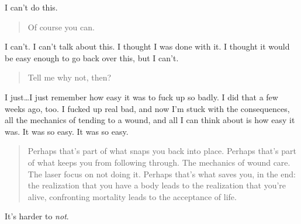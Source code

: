 I can't do this.

\begin{quote}
Of course you can.
\end{quote}

I can't. I can't talk about this. I thought I was done with it. I thought it would be easy enough to go back over this, but I can't.

\begin{quote}
Tell me why not, then?
\end{quote}

I just\ldots{}I just remember how easy it was to fuck up so badly. I did that a few weeks ago, too. I fucked up real bad, and now I'm stuck with the consequences, all the mechanics of tending to a wound, and all I can think about is how easy it was. It was so easy. It was so easy.

\begin{quote}
Perhaps that's part of what snaps you back into place. Perhaps that's part of what keeps you from following through. The mechanics of wound care. The laser focus on not doing it. Perhaps that's what saves you, in the end: the realization that you have a body leads to the realization that you're alive, confronting mortality leads to the acceptance of life.
\end{quote}

It's harder to \emph{not}.
